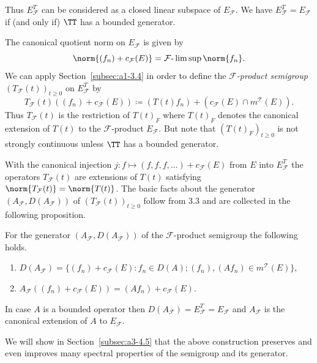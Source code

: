 Thus $E_{\mathcal{F}}^{T}$ can be considered as a closed linear subspace of\/ $E_{\mathcal{F}}$. 
We have $E_{\mathcal{F}}^{T} = E_{\mathcal{F}}$ if (and only if) $\TT$ has a bounded generator.

The canonical quotient norm on $E_{\mathcal{F}}$ is given by
\[
    \norm{(f_{n}) + c_{\mathcal{F}}(E)} = \mathcal{F}\text{-}\lim \sup \norm{f_{n}} .
\]
We can apply Section~\ref{subsec:a1-3.4} in order to define the \emph{$\mathcal{F}$-product semigroup} $(T_{\mathcal{F}}(t))_{t \geq 0}$ on $E_{\mathcal{F}}^{T}$ by
\[
    T_{\mathcal{F}}(t)((f_{n}) + c_{\mathcal{F}}(E)) \coloneqq (T(t)f_{n}) 
    	+ ( c_{\mathcal{F}}(E)\cap m^{\mathcal{T}}(E) ) .
\]
Thus $T_{\mathcal{F}}(t)$ is the restriction of\/ $T(t)_{F}$ where $T(t)_{F}$ denotes the canonical extension of\/ $T(t)$ to the $\mathcal{F}$-product $E_{\mathcal{F}}$. 
But note that $(T(t)_{F})_{t \geq 0}$ is not strongly continuous unless $\TT$ has a bounded generator.

With the canonical injection $j \colon f \mapsto (f,f,f,\ldots) + c_{\mathcal{F}}(E)$ from $E$ into $E_{\mathcal{F}}^{T}$ the operators $T_{\mathcal{F}}(t)$ are extensions of\/ $T(t)$ satisfying $\norm{T_{\mathcal{F}}(t)} = \norm{T(t)}$. The basic facts about the generator $(A_{\mathcal{F}},D(A_{\mathcal{F}}))$ of\/ $(T_{\mathcal{F}}(t))_{t \geq 0}$ follow from 3.3 and are collected in the following proposition.
\begin{proposition*}\label{prop:a1-3.6}
For the generator $(A_{\mathcal{F}},D(A_{\mathcal{F}}))$ of the $\mathcal{F}$-product semigroup the following holds.
\begin{enumerate}[\upshape(i)]
\item 
$D(A_{\mathcal{F}}) = \{(f_{n}) + c_{\mathcal{F}}(E) \colon f_{n} \in D(A); (f_{n}), (Af_{n}) \in m^{\mathcal{T}}(E)\}$,

\item 
$A_{\mathcal{F}}((f_{n}) + c_{\mathcal{F}}(E)) = (Af_{n}) + c_{\mathcal{F}}(E)$.

\end{enumerate}
\end{proposition*}
In case $A$ is a bounded operator then $D(A_{\mathcal{F}}) = E_{\mathcal{F}}^{T} = E_{\mathcal{F}}$ and $A_{\mathcal{F}}$ is the canonical extension of\/ $A$ to $E_{\mathcal{F}}$.

We will show in Section~\ref{subsec:a3-4.5} that the above construction preserves and even improves many spectral properties of the semigroup and its generator.

